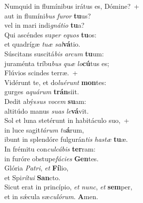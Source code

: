 \evenverse Numquid in flumínibus irátus es, Dómine?~+\\\evenverse  aut in flumíni\textit{bus} \textit{fu}\textit{ror} \textbf{tu}us?~\*\\
\evenverse vel in mari indi\textit{gná}\textit{ti}\textit{o} \textbf{tu}a?\\
\oddverse Qui ascéndes su\textit{per} \textit{e}\textit{quos} \textbf{tu}os:~\*\\
\oddverse et quadrígæ \textit{tu}\textit{æ} \textit{sal}\textbf{vá}tio.\\
\evenverse Súscitans suscitá\textit{bis} \textit{ar}\textit{cum} \textbf{tu}um:~\*\\
\evenverse juraménta tríbu\textit{bus} \textit{quæ} \textit{lo}\textbf{cú}tus es;\\
\oddverse Flúvios scindes terræ.~+\\
\oddverse  Vidérunt te, et do\textit{lu}\textit{é}\textit{runt} \textbf{mon}tes:~\*\\
\oddverse gurges \textit{a}\textit{quá}\textit{rum} \textbf{trán}siit.\\
\evenverse Dedit abýs\textit{sus} \textit{vo}\textit{cem} \textbf{su}am:~\*\\
\evenverse altitúdo manus \textit{su}\textit{as} \textit{le}\textbf{vá}vit.\\
\oddverse Sol et luna stetérunt in habitáculo suo,~+\\
\oddverse  in luce sagit\textit{tá}\textit{rum} \textit{tu}\textbf{á}rum,~\*\\
\oddverse ibunt in splendóre fulgurán\textit{tis} \textit{ha}\textit{stæ} \textbf{tu}æ.\\
\evenverse In frémitu con\textit{cul}\textit{cá}\textit{bis} \textbf{ter}ram:~\*\\
\evenverse in furóre obstupe\textit{fá}\textit{ci}\textit{es} \textbf{Gen}tes.\\
\oddverse Glória \textit{Pa}\textit{tri}, \textit{et} \textbf{Fí}lio,~\*\\
\oddverse et Spi\textit{rí}\textit{tu}\textit{i} \textbf{San}cto.\\
\evenverse Sicut erat in princípio, \textit{et} \textit{nunc}, \textit{et} \textbf{sem}per,~\*\\
\evenverse et in sǽcula sæ\textit{cu}\textit{ló}\textit{rum}. \textbf{A}men.\\

